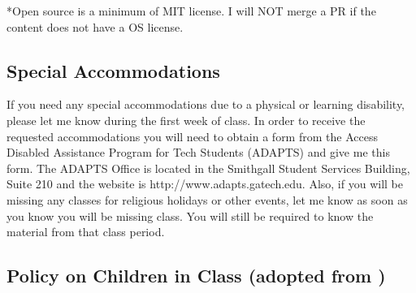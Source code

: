 \documentclass[11pt]{article}
\begin{document}
*Open source is a minimum of MIT license. I will NOT merge a PR if the content does not have a OS license.



\subsection*{Special Accommodations}

If you need any special accommodations due to a physical or learning disability, please let me
know during the first week of class. In order to receive the requested accommodations you will
need to obtain a form from the Access Disabled Assistance Program for Tech Students (ADAPTS)
and give me this form. The ADAPTS Office is located in the Smithgall Student Services Building,
Suite 210 and the website is http://www.adapts.gatech.edu.
Also, if you will be missing any classes for religious holidays or other events, let me know as soon
as you know you will be missing class. You will still be required to know the material from that
class period.

\subsection*{Policy on Children in Class (adopted from \@guygrossman)}
\end{document}
